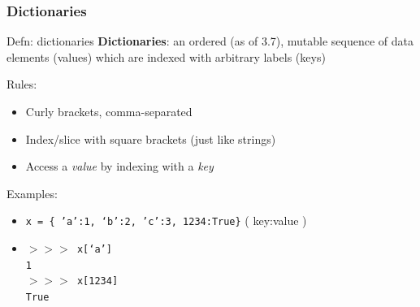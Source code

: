 \documentclass{beamer}
\newcommand{\code}[1]{\texttt{#1}}
\newcommand{\shp}{$>>>$ }
\begin{document}
\begin{frame}	
	\frametitle{Dictionaries}
	
	\begin{alertblock}{Defn: dictionaries}
		\textbf{Dictionaries}: an ordered (as of 3.7), mutable sequence of data elements (values) which are indexed with arbitrary labels (keys)
		
		\vspace{10pt}
		Rules:
		\begin{itemize}
			\item Curly brackets, comma-separated
			\item Index/slice with square brackets (just like strings)
			\item Access a \emph{value} by indexing with a \emph{key}
		\end{itemize}
		
		\vspace{10pt}
		Examples:
		\begin{itemize}
			\item \code{x = \{ 'a':1, `b':2, 'c':3, 1234:True\}} ( key:value )
			\item \code{\shp x[`a'] \\
							1 \\
							\shp x[1234] \\
							True
							}
		\end{itemize}
	\end{alertblock}
	
\end{frame}
\end{document}
